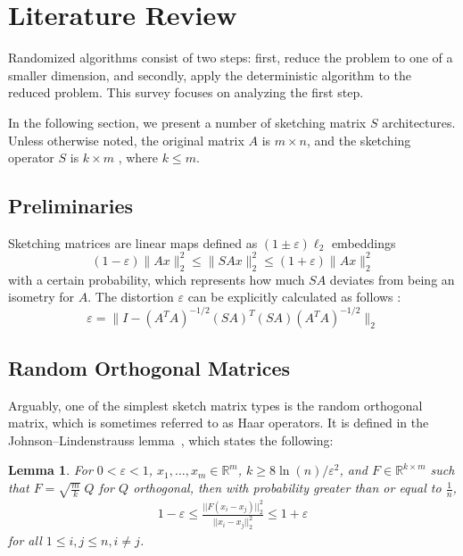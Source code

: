 \documentclass{article}
\newtheorem{lemma}[theorem]{Lemma}
\begin{document}
\section{Literature Review}

Randomized algorithms consist of two steps: first, reduce the problem to one of a smaller dimension, and secondly, apply the deterministic algorithm to the reduced problem. This survey focuses on analyzing the first step.

In the following section, we present a number of sketching matrix  $S$ architectures. Unless otherwise noted, the original matrix $A$ is $m \times n$, and the sketching operator $S$ is $k \times m $ , where $k \leq m$.

\subsection{Preliminaries}
Sketching matrices are linear maps defined as $(1\pm \varepsilon) \ell_2$ embeddings 
\begin{equation}
    (1 - \varepsilon) \|Ax\|^2_2 \leq \|SAx\|^2_2 \leq (1+\varepsilon) \|Ax\|^2_2
\end{equation}
with a certain probability, which represents how much $SA$ deviates from being an isometry for $A$. The distortion $\varepsilon$ can be explicitly calculated as follows \cite{magdonismail2019fastfixeddimensionl2subspace}:
\begin{equation}
    \varepsilon = \|I - (A^TA)^{-1/2} (SA)^T (SA) (A^TA)^{-1/2}\|_2
\end{equation}

\subsection{Random Orthogonal Matrices}


Arguably, one of the simplest sketch matrix types is the random orthogonal matrix, which is sometimes referred to as Haar operators. It is defined in the Johnson–Lindenstrauss lemma~\cite{https://doi.org/10.1002/rsa.10073,Johnson1984ExtensionsOL}, which states the following:\\
\begin{lemma}
\textit{
For $0 < \varepsilon < 1$, $x_1, \dots, x_m \in \mathbb{R}^m$, $k \geq 8 \ln(n) / \varepsilon^2$, and $F \in \mathbb{R}^{k \times m}$ such that $F = \sqrt{\frac mk} \; Q$ for $Q$ orthogonal, then with probability greater than or equal to $\frac 1n$,
\begin{align*}
    1 - \varepsilon \leq \frac{||F (x_i - x_j)||_2^2}{||x_i - x_j||_2^2} \leq  1 + \varepsilon
\end{align*} 
for all $1 \leq i, j\leq n, i \neq j$.}\end{lemma}
\end{document}
